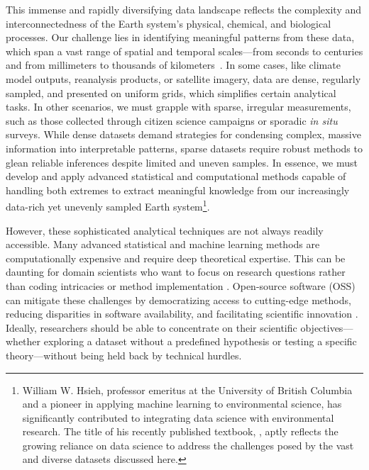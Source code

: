 This immense and rapidly diversifying data landscape reflects the complexity and interconnectedness of the Earth system's physical, chemical, and biological processes. Our challenge lies in identifying meaningful patterns from these data, which span a vast range of spatial and temporal scales---from seconds to centuries and from millimeters to thousands of kilometers~\cite{dickey_role_2001}. In some cases, like climate model outputs, reanalysis products, or satellite imagery, data are dense, regularly sampled, and presented on uniform grids, which simplifies certain analytical tasks. In other scenarios, we must grapple with sparse, irregular measurements, such as those collected through citizen science campaigns or sporadic \textit{in situ} surveys. While dense datasets demand strategies for condensing complex, massive information into interpretable patterns, sparse datasets require robust methods to glean reliable inferences despite limited and uneven samples. In essence, we must develop and apply advanced statistical and computational methods capable of handling both extremes to extract meaningful knowledge from our increasingly data-rich yet unevenly sampled Earth system\footnote{William W. Hsieh, professor emeritus at the University of British Columbia and a pioneer in applying machine learning to environmental science, has significantly contributed to integrating data science with environmental research. The title of his recently published textbook,  \cite{hsieh_introduction_2023}, aptly reflects the growing reliance on data science to address the challenges posed by the vast and diverse datasets discussed here.}.

However, these sophisticated analytical techniques are not always readily accessible. Many advanced statistical and machine learning methods are computationally expensive and require deep theoretical expertise. This can be daunting for domain scientists who want to focus on research questions rather than coding intricacies or method implementation \cite{fan_challenges_2013}. Open-source software (OSS) can mitigate these challenges by democratizing access to cutting-edge methods, reducing disparities in software availability, and facilitating scientific innovation \cite{hoe_breaking_2006, sonnenburg_need_2007}. Ideally, researchers should be able to concentrate on their scientific objectives---whether exploring a dataset without a predefined hypothesis or testing a specific theory---without being held back by technical hurdles.

